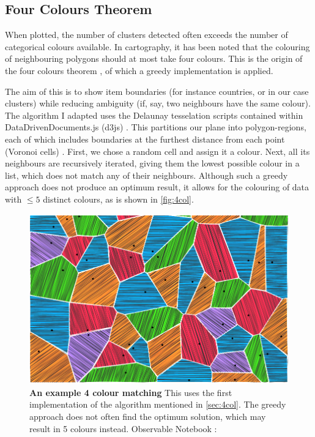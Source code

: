 \subsection{Four Colours Theorem}\label{sec:4col}
When plotted, the number of clusters detected often exceeds the number of categorical colours available. In cartography, it has been noted that the colouring of neighbouring polygons should at most take four colours. This is the origin of the four colours theorem \cite{fourcolour}, of which a greedy implementation is applied.

The aim of this is to show item boundaries (for instance countries, or in our case clusters) while reducing ambiguity (if, say, two neighbours have the same colour). The algorithm I adapted uses the Delaunay tesselation scripts contained within DataDrivenDocuments.js (d3js) \cite{d3js}. This partitions our plane into polygon-regions, each of which includes boundaries at the furthest distance from each point (Voronoi cells) \cite{delaunay}. First, we chose a random cell and assign it a colour. 
Next, all its neighbours are recursively iterated, giving them the lowest possible colour in a list, which does not match any of their neighbours. Although such a greedy approach does not produce an optimum result, it allows for the colouring of data with $\le 5$ distinct colours, as is shown in \autoref{fig:4col}.


\begin{figure}[H]
  \centering
\includegraphics[width=.8\textwidth]{4fig/4col.png}
\caption{\textbf{An example 4 colour matching} This uses the first implementation of the algorithm mentioned in \autoref{sec:4col}. The greedy approach does not often find the optimum solution, which may result in 5 colours instead. Observable Notebook : \cite{4colobs}}\label{fig:4col}
\end{figure}



